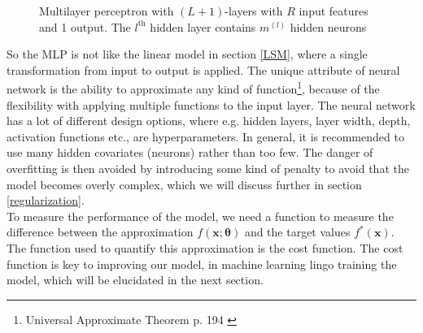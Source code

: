 \begin{figure}[th]
	\caption[Multilayer Perceptron with $(L+1)$-layers]{Multilayer perceptron with $(L+1)$-layers with $R$ input features and 1 output. The $l^{\text{th}}$ hidden layer contains $m^{(l)}$ hidden neurons}
	\label{fig:multilayer-perceptron}
\end{figure}

So the MLP is not like the linear model in section \ref{LSM}, where a single transformation from input to output is applied. The unique attribute of neural network is the ability to approximate any kind of function\footnote{Universal Approximate Theorem p. 194 \parencite{Goodfellow-et-al-2016}}, because of the flexibility with applying multiple functions to the input layer. The neural network has a lot of different design options, where e.g. hidden layers, layer width, depth, activation functions etc., are hyperparameters. In general, it is recommended to use many hidden covariates (neurons) rather than too few. The danger of overfitting is then avoided by introducing some kind of penalty to avoid that the model becomes overly complex, which we will discuss further in section \ref{regularization}.\\

To measure the performance of the model, we need a function to measure the difference between the approximation $f(\bm{x};\bm{\theta})$ and the target values $f^*(\bm{x})$. The function used to quantify this approximation is the cost function. The cost function is key to improving our model, in machine learning lingo training the model, which will be elucidated in the next section.

